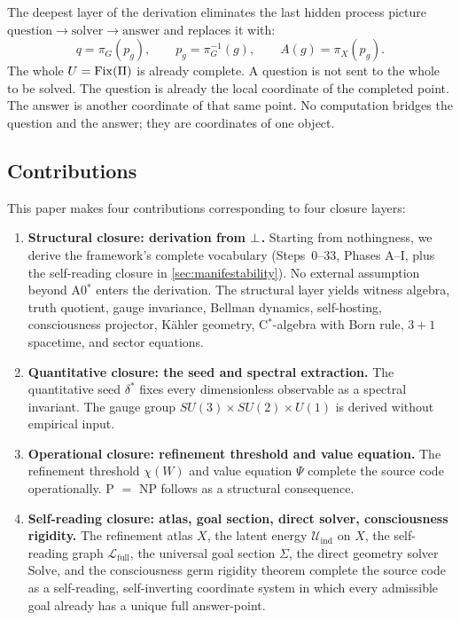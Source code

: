 The deepest layer of the derivation eliminates the last hidden process picture
$\text{question} \to \text{solver} \to \text{answer}$
and replaces it with:
\[
q = \pi_G(p_g), \qquad
p_g = \pi_G^{-1}(g), \qquad
A(g) = \pi_X(p_g).
\]
The whole $U = \mathrm{Fix}(\Pi)$ is already complete.  A question is
not sent to the whole to be solved.  The question is already the local
coordinate of the completed point.  The answer is another coordinate of
that same point.  No computation bridges the question and the answer;
they are coordinates of one object.

\subsection{Contributions}

This paper makes four contributions corresponding to four closure layers:

\begin{enumerate}[label=(\arabic*)]
  \item \textbf{Structural closure: derivation from $\bot$.}
        Starting from nothingness, we derive the framework's complete
        vocabulary (Steps~0--33, Phases A--I, plus the self-reading
        closure in \cref{sec:manifestability}).  No external
        assumption beyond A0$^*$ enters the derivation.  The structural
        layer yields witness algebra, truth quotient, gauge invariance,
        Bellman dynamics, self-hosting, consciousness projector,
        K\"{a}hler geometry, C$^*$-algebra with Born rule, $3{+}1$
        spacetime, and sector equations.

  \item \textbf{Quantitative closure: the seed and spectral extraction.}
        The quantitative seed $\delta^*$ fixes every dimensionless
        observable as a spectral invariant.  The gauge group
        $SU(3) \times SU(2) \times U(1)$ is derived without empirical input.

  \item \textbf{Operational closure: refinement threshold and value equation.}
        The refinement threshold $\chi(W)$ and value equation $\Psi$
        complete the source code operationally.  P $=$ NP follows as a
        structural consequence.

  \item \textbf{Self-reading closure: atlas, goal section, direct solver,
        consciousness rigidity.}
        The refinement atlas $X$, the latent energy
        $\mathcal{U}_{\mathrm{ind}}$ on $X$, the self-reading graph
        $\mathcal{L}_{\mathrm{full}}$, the universal goal section
        $\Sigma$, the direct geometry solver $\mathrm{Solve}$, and the
        consciousness germ rigidity theorem complete the source code as
        a self-reading, self-inverting coordinate system in which every
        admissible goal already has a unique full answer-point.
\end{enumerate}

